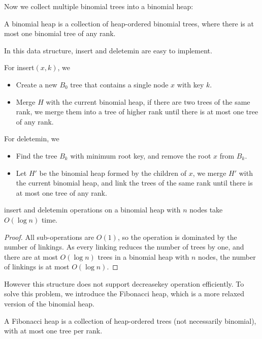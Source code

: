 Now we collect multiple binomial trees into a binomial heap:

\begin{definition}
	A binomial heap is a collection of heap-ordered binomial trees, where there is at most one binomial tree of any rank.
\end{definition}

In this data structure, insert and deletemin are easy to implement.

For insert$(x,k)$, we
\begin{itemize}
	\item Create a new $B_0$ tree that contains a single node $x$ with key $k$.
	\item Merge $H$ with the current binomial heap, if there are two trees of the same rank, we merge them into a tree of higher rank until there is at most one tree of any rank.
\end{itemize}

For deletemin, we
\begin{itemize}
	\item Find the tree $B_k$ with minimum root key, and remove the root $x$ from $B_k$.
	\item Let $H'$ be the binomial heap formed by the children of $x$, we merge $H'$ with the current binomial heap, and link the trees of the same rank until there is at most one tree of any rank.
\end{itemize}

\begin{lemma}
	insert and deletemin operations on a binomial heap with $n$ nodes take $O(\log n)$ time.
\end{lemma}
\begin{proof}
	All sub-operations are $O(1)$, so the operation is dominated by the number of linkings.
	As every linking reduces the number of trees by one, and there are at most $O(\log n)$ trees in a binomial heap with $n$ nodes, the number of linkings is at most $O(\log n)$.
\end{proof}

However this structure does not support decreasekey operation efficiently. To solve this problem, we introduce the Fibonacci heap, which is a more relaxed version of the binomial heap.

\begin{definition}
	A Fibonacci heap is a collection of heap-ordered trees (not necessarily binomial), with at most one tree per rank.
\end{definition}

